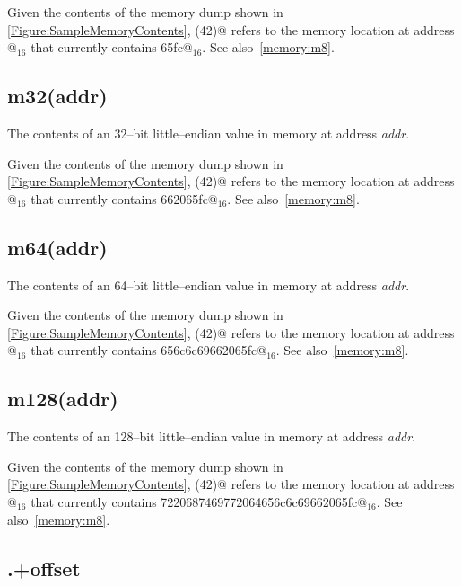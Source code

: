 Given the contents of the memory dump shown in 
\autoref{Figure:SampleMemoryContents}, 
(42)@ refers to the memory location at address @$_{16}$
that currently contains \verb@65fc@$_{16}$. See also~\autoref{memory:m8}.


\subsection{m32(addr)}

The contents of an 32--bit little--endian value in memory at address {\em addr}.

Given the contents of the memory dump shown in
\autoref{Figure:SampleMemoryContents},
(42)@ refers to the memory location at address @$_{16}$
that currently contains \verb@662065fc@$_{16}$.
See also~\autoref{memory:m8}.

\subsection{m64(addr)}

The contents of an 64--bit little--endian value in memory at address {\em addr}.

Given the contents of the memory dump shown in 
\autoref{Figure:SampleMemoryContents}, 
(42)@ refers to the memory location at address @$_{16}$
that currently contains \verb@656c6c69662065fc@$_{16}$.
See also~\autoref{memory:m8}.

\subsection{m128(addr)}

The contents of an 128--bit little--endian value in memory at 
address {\em addr}.

Given the contents of the memory dump shown in 
\autoref{Figure:SampleMemoryContents}, 
(42)@ refers to the memory location at address @$_{16}$
that currently contains \verb@7220687469772064656c6c69662065fc@$_{16}$.
See also~\autoref{memory:m8}.

\subsection{.+offset}


